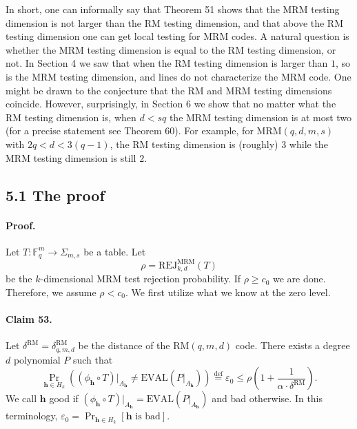 In short, one can informally say that Theorem 51 shows that the MRM testing dimension is not larger than the RM testing dimension, and that above the RM testing dimension one can get local testing for MRM codes. A natural question is whether the MRM testing dimension is equal to the RM testing dimension, or not. In Section 4 we saw that when the RM testing dimension is larger than $1$, so is the MRM testing dimension, and lines do not characterize the MRM code. One might be drawn to the conjecture that the RM and MRM testing dimensions coincide. However, surprisingly, in Section 6 we show that no matter what the RM testing dimension is, when $d<sq$ the MRM testing dimension is at most two (for a precise statement see Theorem 60). For example, for $\mathrm{MRM}(q,d,m,s)$ with $2q<d<3(q-1)$, the RM testing dimension is (roughly) $3$ while the MRM testing dimension is still $2$.
\subsection*{5.1 The proof}
\paragraph{Proof.} Let $T:\mathbb F_q^m\to\Sigma_{m,s}$ be a table. Let
\[\rho=\mathrm{REJ}_{k,d}^{\mathrm{MRM}}(T)\]
be the $k$-dimensional MRM test rejection probability. If $\rho\geq c_0$ we are done. Therefore, we assume $\rho<c_0$. We first utilize what we know at the zero level.
\paragraph{Claim 53.} Let $\delta^{\mathrm{RM}}=\delta_{q,m,d}^{\mathrm{RM}}$ be the distance of the $\mathrm{RM}(q,m,d)$ code. There exists a degree $d$ polynomial $P$ such that
\[\Pr_{\boldsymbol h\in H_k}((\phi_{\boldsymbol h}\circ T)|_{A_{\boldsymbol h}}\neq\mathrm{EVAL}(P|_{A_{\boldsymbol h}}))\stackrel{\mathrm{def}}=\varepsilon_0\leq\rho\left(1+\frac1{\alpha\cdot\delta^{\mathrm{RM}}}\right).\]
We call $\boldsymbol h$ good if $(\phi_{\boldsymbol h}\circ T)|_{A_{\boldsymbol h}}=\mathrm{EVAL}(P|_{A_{\boldsymbol h}})$ and bad otherwise. In this terminology, $\varepsilon_0=\Pr_{\boldsymbol h\in H_k}[\boldsymbol h\text{ is bad}]$.
